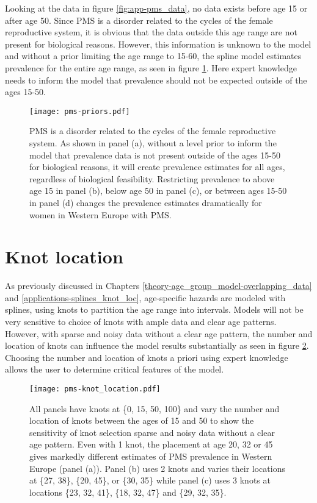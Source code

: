 Looking at the data in figure \ref{fig:app-pms_data}, no data exists before age 15 or after age 50.  Since PMS is a disorder related to the cycles of the female reproductive system, it is obvious that the data outside this age range are not present for biological reasons.  However, this information is unknown to the model and without a prior limiting the age range to 15-60, the spline model estimates prevalence for the entire age range, as seen in figure \ref{fig:app-prios_on_level}.  Here expert knowledge needs to inform the model that prevalence should not be expected outside of the ages 15-50.

    \begin{figure}
        \begin{center}
            \texttt{[image: pms-priors.pdf]}
        \end{center}
        \caption{PMS is a disorder related to the cycles of the female reproductive system.  As shown in panel (a), without a level prior to inform the model that prevalence data is not present outside of the ages 15-50 for biological reasons, it will create prevalence estimates for all ages, regardless of biological feasibility.  Restricting prevalence to above age 15 in panel (b), below age 50 in panel (c), or between ages 15-50 in panel (d) changes the prevalence estimates dramatically for women in Western Europe with PMS.}
        \label{fig:app-prios_on_level}
    \end{figure}

\section{Knot location}
As previously discussed in Chapters \ref{theory-age_group_model-overlapping_data} and \ref{applications-splines_knot_loc}, age-specific hazards are modeled with splines, using knots to partition the age range into intervals.  Models will not be very sensitive to choice of knots with ample data and clear age patterns.  However, with sparse and noisy data without a clear age pattern, the number and location of knots can influence the model results substantially as seen in figure \ref{fig:app-knot_loc}.  Choosing the number and location of knots a priori using expert knowledge allows the user to determine critical features of the model.

    \begin{figure}
        \begin{center}
            \texttt{[image: pms-knot\_location.pdf]}
        \end{center}
        \caption{All panels have knots at \{0, 15, 50, 100\} and vary the number and location of knots between the ages of 15 and 50 to show the sensitivity of knot selection sparse and noisy data without a clear age pattern. Even with 1 knot, the placement at age 20, 32 or 45 gives markedly different estimates of PMS prevalence in Western Europe (panel (a)).  Panel (b) uses 2 knots and varies their locations at \{27, 38\}, \{20, 45\}, or \{30, 35\} while panel (c) uses 3 knots at locations \{23, 32, 41\}, \{18, 32, 47\} and \{29, 32, 35\}.}
        \label{fig:app-knot_loc}
    \end{figure}

